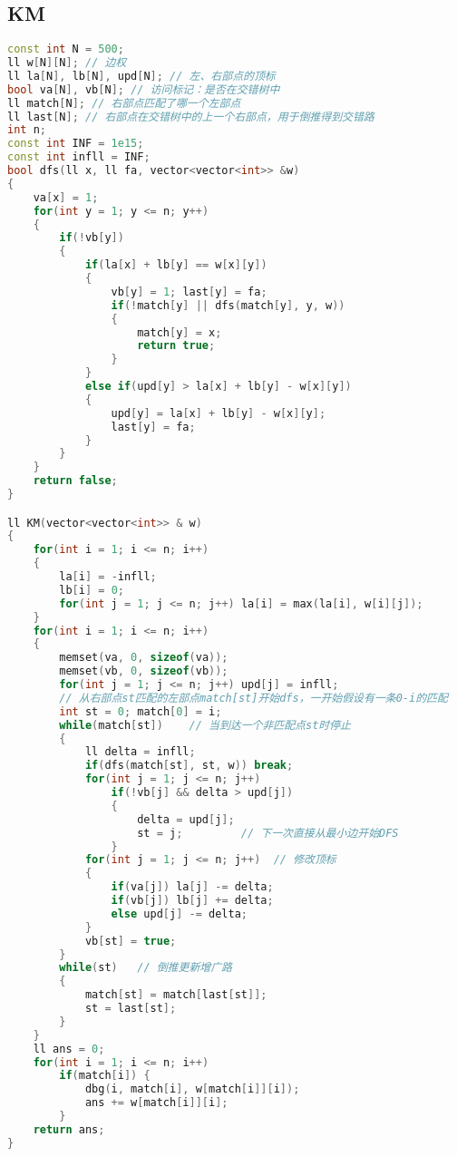\subsection{KM}
\begin{lstlisting}[language=c++]
const int N = 500;
ll w[N][N]; // 边权
ll la[N], lb[N], upd[N]; // 左、右部点的顶标
bool va[N], vb[N]; // 访问标记：是否在交错树中
ll match[N]; // 右部点匹配了哪一个左部点
ll last[N]; // 右部点在交错树中的上一个右部点，用于倒推得到交错路
int n;
const int INF = 1e15;
const int infll = INF;
bool dfs(ll x, ll fa, vector<vector<int>> &w) 
{
    va[x] = 1;
    for(int y = 1; y <= n; y++)
    {
        if(!vb[y])
        {
            if(la[x] + lb[y] == w[x][y]) 
            { 
                vb[y] = 1; last[y] = fa;
                if(!match[y] || dfs(match[y], y, w)) 
                {
                    match[y] = x;
                    return true;
                }
            }
            else if(upd[y] > la[x] + lb[y] - w[x][y]) 
            {
                upd[y] = la[x] + lb[y] - w[x][y];
                last[y] = fa;
            }
        }
    }
    return false;
}

ll KM(vector<vector<int>> & w) 
{
    for(int i = 1; i <= n; i++) 
    {
        la[i] = -infll;
        lb[i] = 0;
        for(int j = 1; j <= n; j++) la[i] = max(la[i], w[i][j]);
    }
    for(int i = 1; i <= n; i++) 
    {
        memset(va, 0, sizeof(va));
        memset(vb, 0, sizeof(vb));
        for(int j = 1; j <= n; j++) upd[j] = infll;
        // 从右部点st匹配的左部点match[st]开始dfs，一开始假设有一条0-i的匹配
        int st = 0; match[0] = i;
        while(match[st])    // 当到达一个非匹配点st时停止
        { 
            ll delta = infll;
            if(dfs(match[st], st, w)) break;
            for(int j = 1; j <= n; j++)
                if(!vb[j] && delta > upd[j]) 
                {
                    delta = upd[j];
                    st = j;         // 下一次直接从最小边开始DFS
                }
            for(int j = 1; j <= n; j++)  // 修改顶标
            {
                if(va[j]) la[j] -= delta;
                if(vb[j]) lb[j] += delta; 
                else upd[j] -= delta;
            }
            vb[st] = true;
        }
        while(st)   // 倒推更新增广路 
        { 
            match[st] = match[last[st]];
            st = last[st];
        }
    }
    ll ans = 0;
    for(int i = 1; i <= n; i++) 
        if(match[i]) {
            dbg(i, match[i], w[match[i]][i]);
            ans += w[match[i]][i];
        }
    return ans;
}
\end{lstlisting}